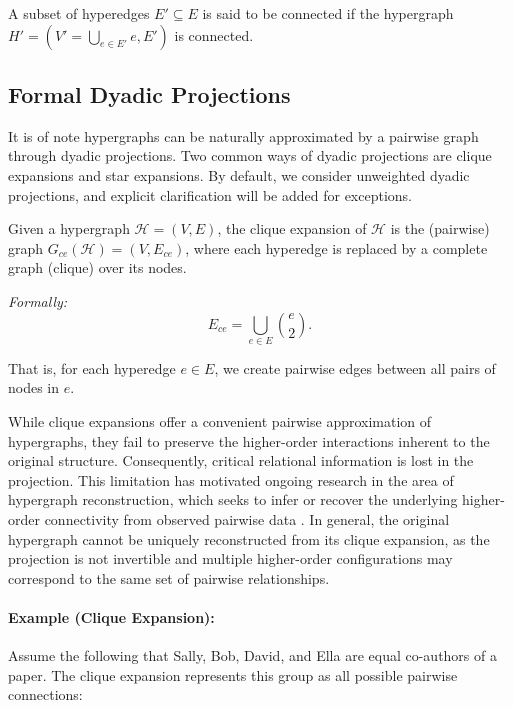 \documentclass{article}
\begin{document}
A subset of hyperedges \( E' \subseteq E \) is said to be connected if the hypergraph \( H' = (V' = \bigcup_{e \in E'} e, E') \) is connected.

\subsection*{Formal Dyadic Projections}

It is of note hypergraphs can be naturally approximated by a pairwise graph through dyadic projections.
 Two common ways of dyadic projections are clique expansions and star expansions. By default, we consider unweighted dyadic projections, and explicit clarification will be added for exceptions.

\begin{mdframed}[linewidth=1pt, linecolor=black!60, backgroundcolor=gray!5]
\begin{defn}
Given a hypergraph $\mathcal{H} = (V, E)$, the clique expansion of $\mathcal{H}$ is the (pairwise) graph $G_{ce}(\mathcal{H}) = (V, E_{ce})$, where each hyperedge is replaced by a complete graph (clique) over its nodes.

\medskip

\noindent\textit{Formally:}
\[
E_{ce} = \bigcup_{e \in E} \binom{e}{2}.
\]

That is, for each hyperedge $e \in E$, we create pairwise edges between all pairs of nodes in $e$.
\end{defn}
\end{mdframed}

While clique expansions offer a convenient pairwise approximation of hypergraphs, they fail to preserve the higher-order interactions inherent to the original structure. Consequently, critical relational information is lost in the projection. This limitation has motivated ongoing research in the area of hypergraph reconstruction, which seeks to infer or recover the underlying higher-order connectivity from observed pairwise data \cite{young_hypergraph_2021, lizotte_hypergraph_2023, wang_graphs_2024}. In general, the original hypergraph cannot be uniquely reconstructed from its clique expansion, as the projection is not invertible and multiple higher-order configurations may correspond to the same set of pairwise relationships.

\paragraph{Example (Clique Expansion):} Assume the following that Sally, Bob, David, and Ella are equal co-authors of a paper. The clique expansion represents this group as all possible pairwise connections:
\end{document}
